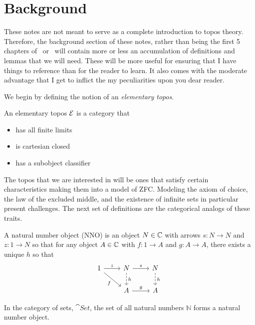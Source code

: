 \section{Background}\label{sec:background}

These notes are not meant to serve as a complete introduction to topos
theory. Therefore, the background section of these notes, rather than
being the first 5 chapters of~\citet{MacLane:92}
or~\citet{Johnstone:14} will contain more or less an accumulation of
definitions and lemmas that we will need. These will be more useful
for ensuring that I have things to reference than for the reader to
learn. It also comes with the moderate advantage that I get to inflict
the my peculiarities upon you dear reader.

We begin by defining the notion of an \emph{elementary topos}.
\begin{defn}\label{defn:background:topos}
  An elementary topos $\mathcal{E}{}$ is a category that
  \begin{itemize}
  \item has all finite limits
  \item is cartesian closed
  \item has a subobject classifier
  \end{itemize}
\end{defn}
The topos that we are interested in will be ones that satisfy certain
characteristics making them into a model of ZFC. Modeling the axiom of
choice, the law of the excluded middle, and the existence of infinite
sets in particular present challenges. The next set of definitions are
the categorical analogs of these traits.
\begin{defn}\label{defn:background:nno}
  A natural number object (NNO) is an object $N \in \mathbb{C}$ with arrows
  $s : N \to N$ and $z : 1 \to N$ so that for any object $A \in \mathbb{C}$
  with $f : 1 \to A$ and $g : A \to A$, there exists a unique $h$ so
  that
  \[
    \begin{tikzcd}
      1 \ar[r, "z"] \ar[dr, swap, "f"] & N \ar[d, dashed, "h"] \ar[r, "s"]& N \ar[d, dashed, "h"]\\
      & A \ar[r, "g"]& A
    \end{tikzcd}
  \]
\end{defn}

\begin{example}
  In the category of sets, $\cat{Set}$, the set of all natural numbers
  $\mathbb{N}$ forms a natural number object.
\end{example}

